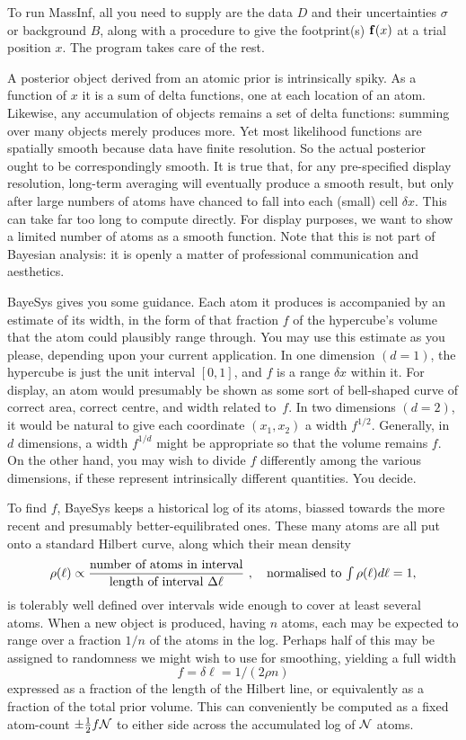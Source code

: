 To run MassInf, all you need to supply are the data $D$ and their uncertainties $\sigma$ or background $B$,
along with a procedure to give the footprint(s) ${\bf f}(x)$ at a trial position $x$.
The program takes care of the rest.
\vfill\eject

\bigskip

A posterior object derived from an atomic prior is intrinsically spiky.
As a function of $x$ it is a sum of delta functions, one at each location of an atom.
Likewise, any accumulation of objects remains a set of delta functions: summing over many objects merely produces more.
Yet most likelihood functions are spatially smooth because data have finite resolution.
So the actual posterior ought to be correspondingly smooth.
It is true that, for any pre-specified display resolution, long-term averaging will eventually produce a smooth result,
but only after large numbers of atoms have chanced to fall into each (small) cell $\delta x$.
This can take far too long to compute directly.
For display purposes, we want to show a limited number of atoms as a smooth function.
Note that this is not part of Bayesian analysis: it is openly a matter of professional communication and aesthetics.

BayeSys gives you some guidance.
Each atom it produces is accompanied by an estimate of its width, 
in the form of that fraction $f$ of the hypercube's volume that the atom could plausibly range through.
You may use this estimate as you please, depending upon your current application.
In one dimension $(d=1)$, the hypercube is just the unit interval $[0,1]$, and $f$ is a range $\delta x$ within it.
For display, an atom would presumably be shown as some sort of bell-shaped curve of correct area, correct centre, and width related to~$f$.
In two dimensions $(d=2)$, it would be natural to give each coordinate $(x_1,x_2)$ a width $f^{1/2}$.
Generally, in $d$ dimensions, a width $f^{1/d}$ might be appropriate so that the volume remains $f$.
On the other hand, you may wish to divide $f$ differently among the various dimensions, if these represent intrinsically different quantities.
You decide.

To find $f$, BayeSys keeps a historical log of its atoms, biassed towards the more recent and presumably better-equilibrated ones.
These many atoms are all put onto a standard Hilbert curve, along which their mean density
$$
  \rho(\ell) \propto {\hbox{number of atoms in interval} \over \hbox{length of interval $\Delta \ell$}}\ ,\quad \hbox{normalised to $\int\rho(\ell)d\ell=1$},
$$
is tolerably well defined over intervals wide enough to cover at least several atoms.
When a new object is produced, having $n$ atoms, each may be expected to range over a fraction $1/n$ of the atoms in the log.
Perhaps half of this may be assigned to randomness we might wish to use for smoothing, yielding a full width
$$
  f = \delta \ell = 1 / (2 \rho n)
$$
expressed as a fraction of the length of the Hilbert line, or equivalently as a fraction of the total prior volume.
This can conveniently be computed as a fixed atom-count $\pm {1\over 2} f {\cal N}$ to either side across the accumulated log of ${\cal N}$ atoms.


